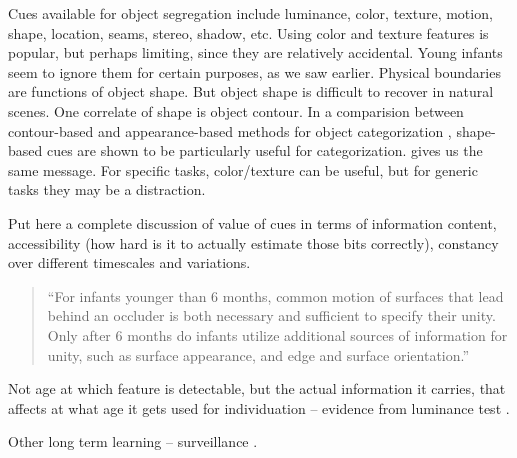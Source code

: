 Cues available for object segregation include luminance, color,
texture, motion, shape, location, seams, stereo, shadow, etc.
%
Using color and texture features is popular, but perhaps limiting, since they
are relatively accidental.  Young infants seem to ignore them for
certain purposes, as we saw earlier.
%
Physical boundaries are functions of object shape.  But object shape
is difficult to recover in natural scenes.
%
One correlate of shape is object contour.  In a comparision between
contour-based and appearance-based methods for object categorization
\cite{leibe03analyzing}, shape-based cues are shown to be
particularly useful for categorization.
 gives us the same message.
For specific tasks, color/texture can be useful, but for 
generic tasks they may be a distraction.


Put here a complete discussion of value of cues in terms of
information content, accessibility (how hard is it to actually
estimate those bits correctly), constancy over different timescales
and variations.



\nocite{serre05object}
\nocite{swain91color}
\nocite{schiele00recognition}
\nocite{lowe04distinctive}
\nocite{felzenszwalb04efficient}
\nocite{quinn05learning}
\nocite{felzenszwalb04efficient}
\nocite{gibson88exploratory}
\nocite{spelke90principles}
\nocite{martin01database}
\nocite{madison01use}
\nocite{scharstein02taxonomy}
\nocite{feldman05information}
\nocite{mareschal02learning}
\nocite{wilcox99object}
\nocite{dannemiller87test}
\nocite{wilcox04priming}
\nocite{johnson96perception}
\nocite{needham05infants}
\nocite{johnson00infants}
\nocite{johnson03development}

\begin{quote}

``For infants younger than 6 months, common motion of surfaces that lead
behind an occluder is both necessary and sufficient to specify their
unity. Only after 6 months do infants utilize additional sources of
information for unity, such as surface appearance, and edge and
surface orientation.'' \cite{mareschal02learning}

\end{quote}


Not age at which feature is detectable, but the actual
information it carries, that affects at what age it gets used for
individuation -- evidence from luminance test \cite{woods05infants}.

Other long term learning -- surveillance \cite{stauffer00learning}.


